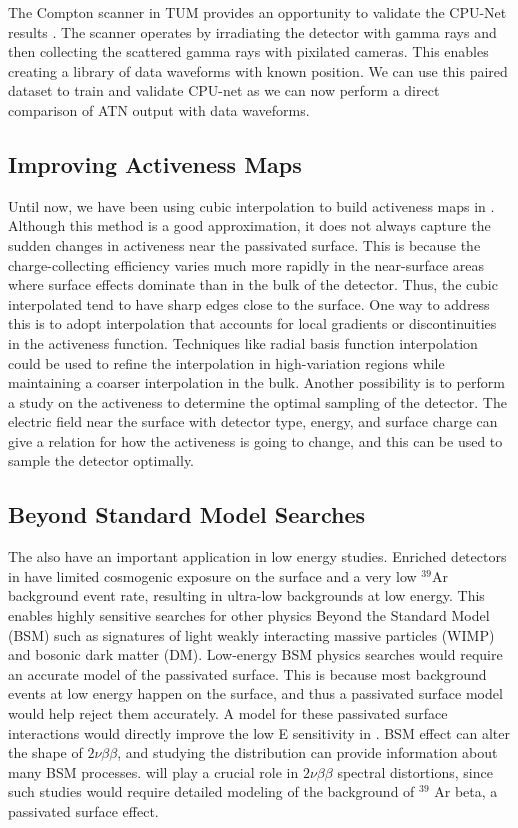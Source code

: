 The Compton scanner in TUM provides an opportunity to validate the CPU-Net results \cite{Abt_2022odr}. The scanner operates by irradiating the detector with gamma rays and then collecting the scattered gamma rays with pixilated cameras. This enables creating a library of data waveforms with known position.
We can use this paired dataset to train and validate CPU-net as we can now perform a direct comparison of ATN output with data waveforms.

\subsection{Improving {\ehd} Activeness Maps}
Until now, we have been using cubic interpolation to build activeness maps in {\ehd}. Although this method is a good approximation, it does not always capture the sudden changes in activeness near the passivated surface. This is because the charge-collecting efficiency varies much more rapidly in the near-surface areas where surface effects dominate than in the bulk of the detector. Thus, the cubic interpolated tend to have sharp edges close to the surface. One way to address this is to adopt interpolation that accounts for local gradients or discontinuities in the activeness function. Techniques like radial basis function interpolation could be used to refine the interpolation in high-variation regions while maintaining a coarser interpolation in the bulk. Another possibility is to perform a study on the activeness to determine the optimal sampling of the detector. The electric field near the surface with detector type, energy, and surface charge can give a relation for how the activeness is going to change, and this can be used to sample the detector optimally.


\subsection{Beyond Standard Model Searches}
The {\ehd} also have an important application in low energy studies. Enriched detectors in {\Lthou} have limited cosmogenic exposure on the surface and a very low $^{39}$Ar background event rate, resulting in ultra-low backgrounds at low energy. This enables highly sensitive searches for other physics Beyond the Standard Model (BSM) such as signatures of light weakly interacting massive particles (WIMP) and bosonic dark matter (DM). Low-energy BSM physics searches would require an accurate model of the passivated surface. This is because most background events at low energy happen on the surface, and thus a passivated surface model would help reject them accurately. A model for these passivated surface interactions would directly improve the low E sensitivity in {\Lthou}. BSM effect can alter the shape of $2\nu\beta\beta$, and studying the distribution can provide information about many BSM processes. {\ehd} will play a crucial role in $2\nu\beta\beta$ spectral distortions, since such studies would require detailed modeling of the background of $^{39}$ Ar beta, a passivated surface effect.


